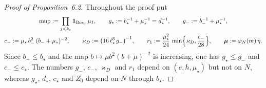 \documentclass[11pt]{amsart}
\theoremstyle{definition}
\begin{document}
\begin{proof}[Proof of Proposition~6.2]
Throughout the proof put
\begin{gather*}
\mathrm{mup}:=\prod_{j<k_\star}\mathbf 1_{\mathrm{Box}_j}\,\mu_I,\qquad g_\star:=b_\star^{-1}+\mu_\star^{-1}=d_\star^{-1},\qquad g_-:=b_-^{-1}+\mu_\star^{-1},\\
c_-:=\mu_\star\,b_-^2\,(b_-+\mu_\star)^{-2},\qquad\varkappa_D:=\bigl(16\,\ell_\star^3\,g_-\bigr)^{-1},\qquad r_1:=\frac{\mu_\star^2}{24}\,\min\Bigl\{\varkappa_D,\frac{c_-}{28}\Bigr\},\qquad\boldsymbol\mu:=\varphi_N(m)\,\eta .
\end{gather*}
Since $b_-\le b_\star$ and the map $b\mapsto\mu b^2(b+\mu)^{-2}$ is increasing, one has $g_\star\le g_-$ and $c_-\le c_\star$.
The numbers $g_-$, $c_-$, $\varkappa_D$ and $r_1$ depend on $(e,h,\mu_\star)$ but not on $N$, whereas $g_\star$, $d_\star$, $c_\star$ and $Z_0$ depend on $N$ through $b_\star$.


\end{proof}
\end{document}
